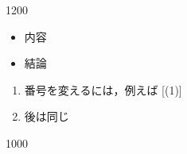 \documentclass[landscape,10pt]{ujarticle}
\begin{document}
\begin{layer}{120}{0}
\end{layer}

\def\mainslidetitley{22}
\def\ketcletter{slidecolora}
\def\ketcbox{slidecolorb}
\def\ketdbox{slidecolorc}
\def\ketcframe{slidecolord}
\def\ketcshadow{slidecolore}
\def\ketdshadow{slidecolorf}
\def\slidetitlex{6}
\def\slidetitlesize{1.3}
\def\mketcletter{slidecolori}
\def\mketcbox{yellow}
\def\mketdbox{yellow}
\def\mketcframe{yellow}
\def\mslidetitlex{62}
\def\mslidetitlesize{2}

\color{black}
\Large\bf\boldmath
\thispagestyle{empty}
\addtocounter{page}{-1}







\vspace*{18mm}

\begin{itemize}
\item
内容
\item
結論
\end{itemize}


\vspace*{18mm}

\begin{enumerate}[(1)]
\item
番号を変えるには，例えば [(1)]
\item
後は同じ
\end{enumerate}


\vspace*{18mm}


\begin{layer}{100}{0}
\end{layer}
\end{document}
